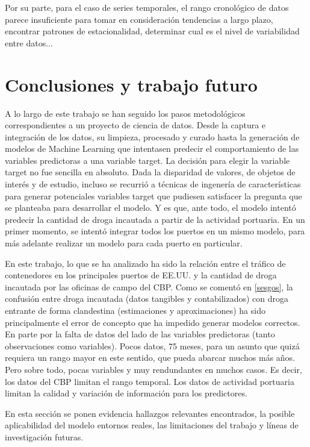 \documentclass[12pt]{article}
\begin{document}
	Por su parte, para el caso de series temporales, el rango cronológico de datos parece insuficiente para tomar en consideración tendencias a largo plazo, encontrar patrones de estacionalidad, determinar cual es el nivel de variabilidad entre datos... 

\newpage
\section{\label{trabajo futuro}Conclusiones y trabajo futuro}
A lo largo de este trabajo se han seguido los pasos metodológicos correspondientes a un proyecto de ciencia de datos. Desde la captura e integración de los datos, su limpieza, procesado y curado hasta la generación de modelos de Machine Learning que intentasen predecir el comportamiento de las variables predictoras a una variable target. La decisión para elegir la variable target no fue sencilla en absoluto. Dada la disparidad de valores, de objetos de interés y de estudio, incluso se recurrió a técnicas de ingenería de características para generar potenciales variables target que pudiesen satisfacer la pregunta que se planteaba para desarrollar el modelo. Y es que, ante todo, el modelo intentó predecir la cantidad de droga incautada a partir de la actividad portuaria. En un primer momento, se intentó integrar todos los puertos en un mismo modelo, para más adelante realizar un modelo para cada puerto en particular.

En este trabajo, lo que se ha analizado ha sido la relación entre el tráfico de contenedores en los principales puertos de EE.UU. y la cantidad de droga incautada por las oficinas de campo del CBP. Como se comentó en \ref{sesgos}, la confusión entre droga incautada (datos tangibles y contabilizados) con droga entrante de forma clandestina (estimaciones y aproximaciones) ha sido principalmente el error de concepto que ha impedido generar modelos correctos. En parte por la falta de datos del lado de las variables predictoras (tanto observaciones como variables). Pocos datos, 75 meses, para un asunto que quizá requiera un rango mayor en este sentido, que pueda abarcar muchos más años. Pero sobre todo, pocas variables y muy rendundantes en muchos casos. Es decir, los datos del CBP limitan el rango temporal. Los datos de actividad portuaria limitan la calidad y variación de información para los predictores.

En esta sección se ponen evidencia hallazgos relevantes encontrados, la posible aplicabilidad del modelo entornos reales, las limitaciones del trabajo y líneas de investigación futuras.
\end{document}
